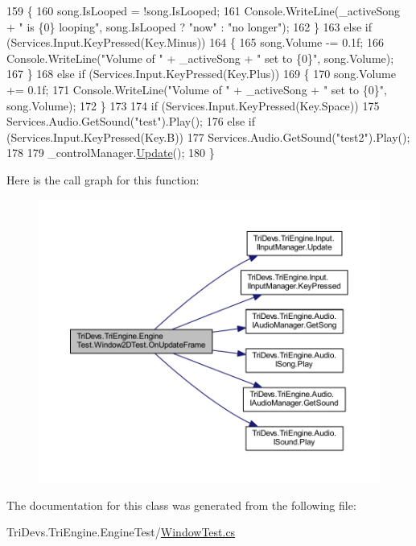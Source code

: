 \begin{DoxyCode}
159             \{
160                 song.IsLooped = !song.IsLooped;
161                 Console.WriteLine(\_activeSong + \textcolor{stringliteral}{" is \{0\} looping"}, song.IsLooped ? \textcolor{stringliteral}{"now"} : \textcolor{stringliteral}{"no longer"});
162             \}
163             \textcolor{keywordflow}{else} \textcolor{keywordflow}{if} (Services.Input.KeyPressed(Key.Minus))
164             \{
165                 song.Volume -= 0.1f;
166                 Console.WriteLine(\textcolor{stringliteral}{"Volume of "} + \_activeSong + \textcolor{stringliteral}{" set to \{0\}"}, song.Volume);
167             \}
168             \textcolor{keywordflow}{else} \textcolor{keywordflow}{if} (Services.Input.KeyPressed(Key.Plus))
169             \{
170                 song.Volume += 0.1f;
171                 Console.WriteLine(\textcolor{stringliteral}{"Volume of "} + \_activeSong + \textcolor{stringliteral}{" set to \{0\}"}, song.Volume);
172             \}
173 
174             \textcolor{keywordflow}{if} (Services.Input.KeyPressed(Key.Space))
175                 Services.Audio.GetSound(\textcolor{stringliteral}{"test"}).Play();
176             \textcolor{keywordflow}{else} \textcolor{keywordflow}{if} (Services.Input.KeyPressed(Key.B))
177                 Services.Audio.GetSound(\textcolor{stringliteral}{"test2"}).Play();
178 
179             \_controlManager.\hyperlink{interface_tri_devs_1_1_tri_engine_1_1_interfaces_1_1_i_updatable_a5392174d0eb92b04a0ef1908ce725f29}{Update}();
180         \}
\end{DoxyCode}


Here is the call graph for this function\-:
\nopagebreak
\begin{figure}[H]
\begin{center}
\leavevmode
\includegraphics[width=350pt]{class_tri_devs_1_1_tri_engine_1_1_engine_test_1_1_window2_d_test_af129342d5dd5f72bf80eeb0df114c1af_cgraph}
\end{center}
\end{figure}




The documentation for this class was generated from the following file\-:\begin{DoxyCompactItemize}
\item 
Tri\-Devs.\-Tri\-Engine.\-Engine\-Test/\hyperlink{_window_test_8cs}{Window\-Test.\-cs}\end{DoxyCompactItemize}

